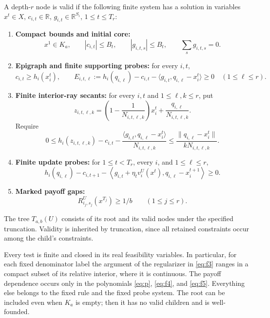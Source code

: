 \documentclass[11pt,a4paper]{article}
\newcommand{\R}{\mathbb R}
\begin{document}
A depth-\(r\) node is valid if the following finite system has a solution
in variables \(x^t\in X\), \(c_{i,t}\in\R\),
\(g_{i,t}\in\R^{S_i}\), \(1\le t\le T_r\):
\begin{enumerate}
\item \textbf{Compact bounds and initial core:}
\begin{equation}
x^1\in K_a,\qquad |c_{i,t}|\le B_t,\qquad
|g_{i,t,s}|\le B_t,\qquad \sum_sg_{i,t,s}=0.
\label{eq:f1}
\end{equation}
\item \textbf{Epigraph and finite supporting probes:} for every \(i,t\),
\begin{equation}
c_{i,t}\ge h_i(x_i^t),\qquad
E_{i,t,\ell}:=h_i(q_{i,\ell})-c_{i,t}
-\langle g_{i,t},q_{i,\ell}-x_i^t\rangle\ge0
\quad(1\le\ell\le r).
\label{eq:f2}
\end{equation}
\item \textbf{Finite interior-ray secants:} for every \(i,t\) and
\(1\le\ell,k\le r\), put
\[
z_{i,t,\ell,k}=
\left(1-\frac1{N_{i,t,\ell,k}}\right)x_i^t
+\frac{q_{i,\ell}}{N_{i,t,\ell,k}}.
\]
Require
\begin{equation}
0\le h_i(z_{i,t,\ell,k})-c_{i,t}
-\frac{\langle g_{i,t},q_{i,\ell}-x_i^t\rangle}{N_{i,t,\ell,k}}
\le\frac{\|q_{i,\ell}-x_i^t\|}{kN_{i,t,\ell,k}}.
\label{eq:f3}
\end{equation}
\item \textbf{Finite update probes:} for \(1\le t<T_r\), every \(i\),
and \(1\le\ell\le r\),
\begin{equation}
h_i(q_{i,\ell})-c_{i,t+1}
-\left\langle g_{i,t}+\eta_t v_i^U(x^t),
q_{i,\ell}-x_i^{t+1}\right\rangle\ge0.
\label{eq:f4}
\end{equation}
\item \textbf{Marked payoff gaps:}
\begin{equation}
R_{i_j,s_j}^U(x^{T_j})\ge1/b\qquad(1\le j\le r).
\label{eq:f5}
\end{equation}
\end{enumerate}
The tree \(T_{a,b}(U)\) consists of its root and its valid nodes under the
specified truncation. Validity is inherited by truncation, since all retained
constraints occur among the child's constraints.

Every test is finite and closed in its real feasibility variables. In particular,
for each fixed denominator label the argument of the regularizer in \eqref{eq:f3}
ranges in a compact subset of its relative interior, where it is continuous. The payoff dependence occurs only in
the polynomials \eqref{eq:p}, \eqref{eq:f4}, and \eqref{eq:f5}. Everything else belongs to the fixed rule
and the fixed probe system. The root can be included even when \(K_a\) is empty;
then it has no valid children and is well-founded.
\end{document}
